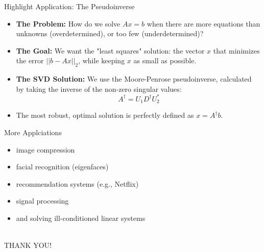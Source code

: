 \documentclass{beamer}
\begin{document}
\begin{frame}{Highlight Application: The Pseudoinverse}
    \begin{itemize}
        \item \textbf{The Problem:} How do we solve $Ax = b$ when there are more equations than unknowns (overdetermined), or too few (underdetermined)?
        \item \textbf{The Goal:} We want the "least squares" solution: the vector $x$ that minimizes the error $||b - Ax||_2$, while keeping $x$ as small as possible.
        \item \textbf{The SVD Solution:} We use the Moore-Penrose pseudoinverse, calculated by taking the inverse of the non-zero singular values: 
        \[ A^\dagger = U_1 D^\dagger U_2^* \]
        \item The most robust, optimal solution is perfectly defined as $x = A^\dagger b$.
    \end{itemize}
\end{frame}

\begin{frame}{More Applciations}
\begin{itemize}
\item image compression
\item facial recognition (eigenfaces)
\item recommendation systems (e.g., Netflix)
\item signal processing
\item and solving ill-conditioned linear systems
\end{itemize}
\end{frame}

\begin{frame}
\centering
\begin{Huge}
\phantom{h}\\
THANK YOU!
\end{Huge}
\end{frame}
\end{document}
